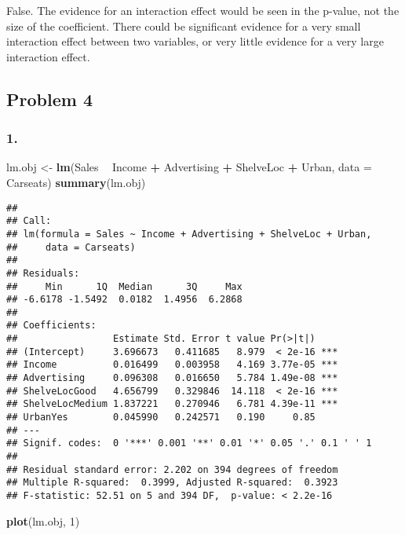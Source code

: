 \documentclass[]{article}
\newenvironment{Shaded}{\begin{snugshade}}{\end{snugshade}}
\newcommand{\DataTypeTok}[1]{\textcolor[rgb]{0.13,0.29,0.53}{#1}}
\newcommand{\DecValTok}[1]{\textcolor[rgb]{0.00,0.00,0.81}{#1}}
\newcommand{\KeywordTok}[1]{\textcolor[rgb]{0.13,0.29,0.53}{\textbf{#1}}}
\newcommand{\NormalTok}[1]{#1}
\newcommand{\OperatorTok}[1]{\textcolor[rgb]{0.81,0.36,0.00}{\textbf{#1}}}
\newcommand{\StringTok}[1]{\textcolor[rgb]{0.31,0.60,0.02}{#1}}
\begin{document}
False. The evidence for an interaction effect would be seen in the
p-value, not the size of the coefficient. There could be significant
evidence for a very small interaction effect between two variables, or
very little evidence for a very large interaction effect.

\hypertarget{problem-4}{%
\subsection{Problem 4}\label{problem-4}}

\hypertarget{section-3}{%
\subsubsection{1.}\label{section-3}}

\begin{Shaded}
\begin{Highlighting}[]
\NormalTok{lm.obj <-}\StringTok{ }\KeywordTok{lm}\NormalTok{(Sales }\OperatorTok{~}\StringTok{ }\NormalTok{Income }\OperatorTok{+}\StringTok{ }\NormalTok{Advertising }\OperatorTok{+}\StringTok{ }\NormalTok{ShelveLoc }\OperatorTok{+}\StringTok{ }\NormalTok{Urban, }\DataTypeTok{data =}\NormalTok{ Carseats)}
\KeywordTok{summary}\NormalTok{(lm.obj)}
\end{Highlighting}
\end{Shaded}

\begin{verbatim}
## 
## Call:
## lm(formula = Sales ~ Income + Advertising + ShelveLoc + Urban, 
##     data = Carseats)
## 
## Residuals:
##     Min      1Q  Median      3Q     Max 
## -6.6178 -1.5492  0.0182  1.4956  6.2868 
## 
## Coefficients:
##                 Estimate Std. Error t value Pr(>|t|)    
## (Intercept)     3.696673   0.411685   8.979  < 2e-16 ***
## Income          0.016499   0.003958   4.169 3.77e-05 ***
## Advertising     0.096308   0.016650   5.784 1.49e-08 ***
## ShelveLocGood   4.656799   0.329846  14.118  < 2e-16 ***
## ShelveLocMedium 1.837221   0.270946   6.781 4.39e-11 ***
## UrbanYes        0.045990   0.242571   0.190     0.85    
## ---
## Signif. codes:  0 '***' 0.001 '**' 0.01 '*' 0.05 '.' 0.1 ' ' 1
## 
## Residual standard error: 2.202 on 394 degrees of freedom
## Multiple R-squared:  0.3999, Adjusted R-squared:  0.3923 
## F-statistic: 52.51 on 5 and 394 DF,  p-value: < 2.2e-16
\end{verbatim}

\begin{Shaded}
\begin{Highlighting}[]
\KeywordTok{plot}\NormalTok{(lm.obj, }\DecValTok{1}\NormalTok{)}
\end{Highlighting}
\end{Shaded}
\end{document}
